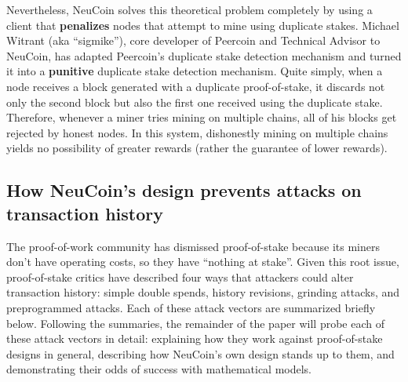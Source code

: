 \documentclass[a4paper,11pt]{article}
\begin{document}
Nevertheless, NeuCoin solves this theoretical problem completely by using a client that \textbf{penalizes} nodes that attempt to mine using duplicate stakes. Michael Witrant (aka ``sigmike''), core developer of Peercoin and Technical Advisor to NeuCoin, has adapted Peercoin's duplicate stake detection mechanism and turned it into a \textbf{punitive} duplicate stake detection mechanism. Quite simply, when a node receives a block generated with a duplicate proof-of-stake, it discards not only the second block but also the first one received using the duplicate stake. Therefore, whenever a miner tries mining on multiple chains, all of his blocks get rejected by honest nodes. In this system, dishonestly mining on multiple chains yields no possibility of greater rewards (rather the guarantee of lower rewards).


\subsection{How NeuCoin's design prevents attacks on transaction history}

The proof-of-work community has dismissed proof-of-stake because its miners don't have operating costs, so they have ``nothing at stake''. Given this root issue, proof-of-stake critics have described four ways that attackers could alter transaction history: simple double spends, history revisions, grinding attacks, and preprogrammed attacks. Each of these attack vectors are summarized briefly below. Following the summaries, the remainder of the paper will probe each of these attack vectors in detail: explaining how they work against proof-of-stake designs in general, describing how NeuCoin's own design stands up to them, and demonstrating their odds of success with mathematical models.
\end{document}
